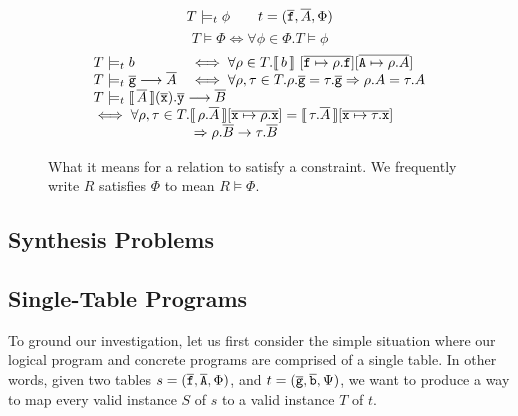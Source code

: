 \begin{figure}[tph]
  \[T \models_t \phi \qquad t = (\overline{\texttt{f}}, \overline{A}, \Phi)\]
  \[T \models \Phi \iff \forall \phi \in \Phi. T \models \phi \]
  \[\begin{array}{ll}
      T \models_t b &\iff \forall \rho \in T. \bracbb{b}~[\overline{\var f \mapsto \rho.\var{f}}][\overline{\var A \mapsto \rho.A}]\\

      T \models_t \vec{\var g} \longrightarrow \vec A & \iff \forall \rho, \tau \in T. \rho.\vec{\var g} = \tau.\vec{\var g} \Rightarrow
                                                        \rho.A = \tau.A \\
      
      \multicolumn 2 l {T \models_t \bracbb{\vec A}(\vec{\var x}).\vec{\var y}
      \longrightarrow \vec B} \\
      \multicolumn 2 l {\iff \forall \rho, \tau \in
    T. \bracbb{\rho.\vec A}[\overline{\var x \mapsto \rho.\var x}] =
    \bracbb{\tau.\vec A}[\overline{\var x \mapsto \tau.\var
      x}]}
      \\ \multicolumn 2 l {\phantom{\iff \forall \rho, \tau \in T.} \Rightarrow \rho.\vec B \rightarrow \tau.\vec B}
    \end{array}\]
  \caption{What it means for a relation to satisfy a constraint. We
    frequently write $R$ satisfies $\Phi$ to mean $R \models \Phi$.}
  \label{fig:conditions-semantics}
\end{figure}

\subsection{Synthesis Problems}

\subsection{Single-Table Programs}

To ground our investigation, let us first consider the simple
situation where our logical program and concrete programs are
comprised of a single table. In other words, given two tables
$s = (\overline{\texttt{f}}, \overline{\texttt{A}}, \Phi)$, and
$t = (\overline{\texttt{g}}, \overline{\texttt{b}}, \Psi)$, we want to produce a way to
map every valid instance $S$ of $s$ to a valid instance $T$ of $t$.

